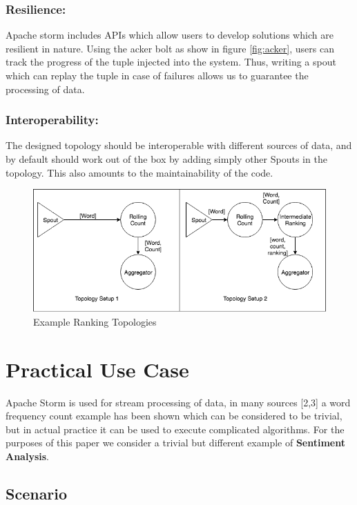 \documentclass[runningheads,a4paper]{llncs}[2015/06/24]
\begin{document}
\subsubsection{Resilience:} Apache storm includes APIs which allow users to develop solutions which are resilient in nature. Using the acker bolt as show in figure \ref{fig:acker}, users can track the progress of the tuple injected into the system. Thus, writing a spout which can replay the tuple in case of failures allows us to guarantee the processing of data.
\subsubsection{Interoperability:} The designed topology should be interoperable with different sources of data, and by default should work out of the box by adding simply other Spouts in the topology. This also amounts to the maintainability of the code.

\begin{figure}
  \begin{center}
    \includegraphics[width=\textwidth]{ranking.png}
    \caption{Example Ranking Topologies}
    \label{fig:ranking}
   \end{center}
\end{figure}



\section{Practical Use Case}
Apache Storm is used for stream processing of data, in many sources [2,3] a word frequency count example has been shown which can be considered to be trivial, but in actual practice it can be used to execute complicated algorithms. For the purposes of this paper we consider a trivial but different example of \textbf{Sentiment Analysis}.

\subsection{Scenario}
\end{document}
